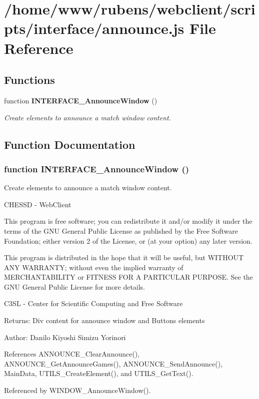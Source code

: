 \section{/home/www/rubens/webclient/scripts/interface/announce.js File Reference}
\label{interface_2announce_8js}
\subsection*{Functions}
\begin{CompactItemize}
\item 
function {\bf INTERFACE\_\-AnnounceWindow} ()
\begin{CompactList}\small\item\em Create elements to announce a match window content. \item\end{CompactList}\end{CompactItemize}


\subsection{Function Documentation}
\subsubsection[INTERFACE\_\-AnnounceWindow]{\setlength{\rightskip}{0pt plus 5cm}function INTERFACE\_\-AnnounceWindow ()}\label{interface_2announce_8js_cdc95f80c2ee1a3882eb93548498f1d2}


Create elements to announce a match window content. 

CHESSD - WebClient

This program is free software; you can redistribute it and/or modify it under the terms of the GNU General Public License as published by the Free Software Foundation; either version 2 of the License, or (at your option) any later version.

This program is distributed in the hope that it will be useful, but WITHOUT ANY WARRANTY; without even the implied warranty of MERCHANTABILITY or FITNESS FOR A PARTICULAR PURPOSE. See the GNU General Public License for more details.

C3SL - Center for Scientific Computing and Free Software \begin{Desc}
\item[Returns:]Div content for announce window and Buttons elements \end{Desc}
\begin{Desc}
\item[Author:]Danilo Kiyoshi Simizu Yorinori \end{Desc}


References ANNOUNCE\_\-ClearAnnounce(), ANNOUNCE\_\-GetAnnounceGames(), ANNOUNCE\_\-SendAnnounce(), MainData, UTILS\_\-CreateElement(), and UTILS\_\-GetText().

Referenced by WINDOW\_\-AnnounceWindow().